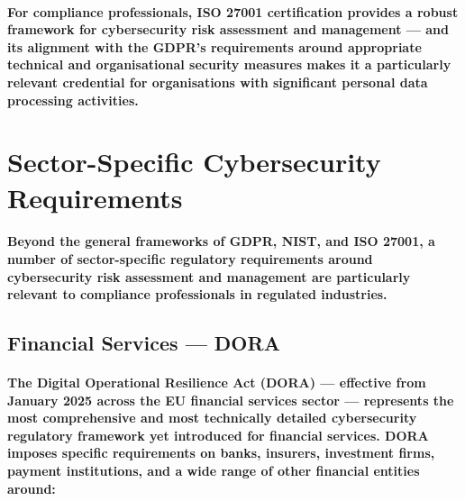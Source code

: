 \paragraph{For compliance professionals, ISO 27001 certification provides a robust framework for cybersecurity risk assessment and management — and its alignment with the GDPR's requirements around appropriate technical and organisational security measures makes it a particularly relevant credential for organisations with significant personal data processing activities.}

\section{Sector-Specific Cybersecurity Requirements}
\paragraph{Beyond the general frameworks of GDPR, NIST, and ISO 27001, a number of sector-specific regulatory requirements around cybersecurity risk assessment and management are particularly relevant to compliance professionals in regulated industries.}

\subsection{Financial Services — DORA}
\paragraph{The \textbf{Digital Operational Resilience Act (DORA)} — effective from January 2025 across the EU financial services sector — represents the most comprehensive and most technically detailed cybersecurity regulatory framework yet introduced for financial services. DORA imposes specific requirements on banks, insurers, investment firms, payment institutions, and a wide range of other financial entities around:}
\begin{itemize}
\end{itemize}
